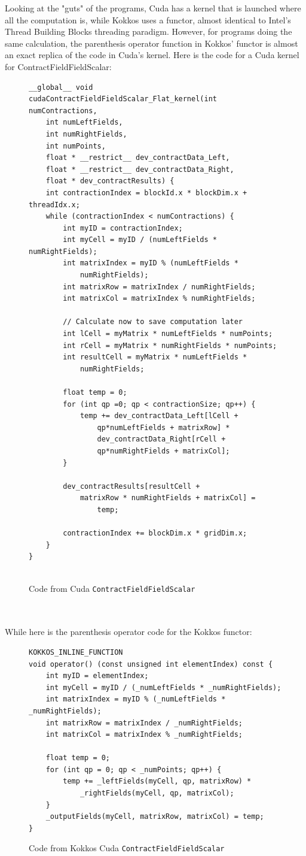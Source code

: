 Looking at the "guts" of the programs, Cuda has a kernel that is launched where
all the computation is, while Kokkos uses a functor, almost identical to
Intel's Thread Building Blocks threading paradigm. However, for programs doing
the same calculation, the parenthesis operator function in Kokkos' functor is
almost an exact replica of the code in Cuda's kernel. Here is the code for a
Cuda kernel for ContractFieldFieldScalar: \\
\begin{figure}[htb]
	\begin{lstlisting}
__global__ void
cudaContractFieldFieldScalar_Flat_kernel(int numContractions,
	int numLeftFields,
	int numRightFields,
	int numPoints,
	float * __restrict__ dev_contractData_Left,
	float * __restrict__ dev_contractData_Right,
	float * dev_contractResults) {
	int contractionIndex = blockId.x * blockDim.x + threadIdx.x;
	while (contractionIndex < numContractions) {
		int myID = contractionIndex;
		int myCell = myID / (numLeftFields * numRightFields);
		int matrixIndex = myID % (numLeftFields * 
			numRightFields);
		int matrixRow = matrixIndex / numRightFields;
		int matrixCol = matrixIndex % numRightFields;
		
		// Calculate now to save computation later
		int lCell = myMatrix * numLeftFields * numPoints;
		int rCell = myMatrix * numRightFields * numPoints;
		int resultCell = myMatrix * numLeftFields * 
			numRightFields;
		
		float temp = 0;
		for (int qp =0; qp < contractionSize; qp++) {
			temp += dev_contractData_Left[lCell + 
				qp*numLeftFields + matrixRow] *
				dev_contractData_Right[rCell + 
				qp*numRightFields + matrixCol];
		}

		dev_contractResults[resultCell + 
			matrixRow * numRightFields + matrixCol] = 
				temp;
		
		contractionIndex += blockDim.x * gridDim.x;
	}
}
	
	\end{lstlisting}
\caption{Code from Cuda \texttt{ContractFieldFieldScalar}
\label{lst:ContractFieldFieldScalar Cuda kernel}}
\end{figure} \\
\\
While here is the parenthesis operator code for the Kokkos functor: \\
\begin{figure}[htb]
	\begin{lstlisting}
KOKKOS_INLINE_FUNCTION
void operator() (const unsigned int elementIndex) const {
	int myID = elementIndex;
	int myCell = myID / (_numLeftFields * _numRightFields);
	int matrixIndex = myID % (_numLeftFields * _numRightFields);
	int matrixRow = matrixIndex / _numRightFields;
	int matrixCol = matrixIndex % _numRightFields;

	float temp = 0;
	for (int qp = 0; qp < _numPoints; qp++) {
		temp += _leftFields(myCell, qp, matrixRow) *
			_rightFields(myCell, qp, matrixCol);
	}
	_outputFields(myCell, matrixRow, matrixCol) = temp;
}
	\end{lstlisting}
\caption{Code from Kokkos Cuda \texttt{ContractFieldFieldScalar}
\label{lst:ContractFieldFieldScalar Kokkos Cuda functor}}
\end{figure}
